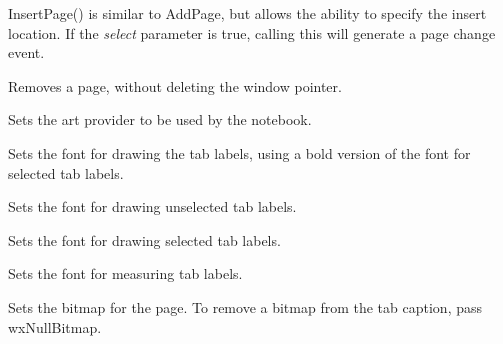 InsertPage() is similar to AddPage, but allows the ability to specify the insert location.
If the {\it select} parameter is true, calling this will generate a page change event.

\label{wxauinotebookremovepage}


Removes a page, without deleting the window pointer.

\label{wxauinotebooksetartprovider}


Sets the art provider to be used by the notebook.

\label{wxauinotebooksetfont}


Sets the font for drawing the tab labels, using a bold version of the font for selected tab labels.

\label{wxauinotebooksetnormalfont}


Sets the font for drawing unselected tab labels.

\label{wxauinotebooksetselectedfont}


Sets the font for drawing selected tab labels.

\label{wxauinotebooksetmeasuringfont}


Sets the font for measuring tab labels.

\label{wxauinotebooksetpagebitmap}


Sets the bitmap for the page.  To remove a bitmap from the tab caption, pass
wxNullBitmap.

\label{wxauinotebooksetpagetext}


